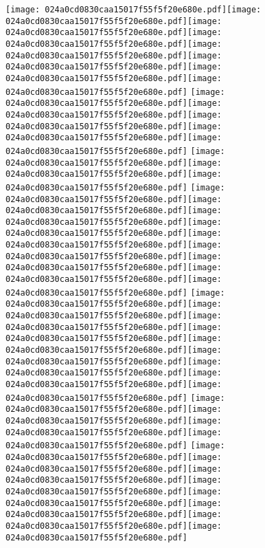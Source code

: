 \documentclass{article}
\newcommand{\origpg}[2]{\texttt{[image: 024a0cd0830caa15017f55f5f20e680e.pdf]}}
\begin{document}
{\vspace{28.908pt}\hspace{18.094pt}\origpg6{103.4pt 437.11pt 115.05pt 453.25pt}\origpg6{114.95pt 437.11pt 122.12pt 453.25pt}\origpg6{122.17pt 437.11pt 130.8pt 453.25pt}\origpg6{130.8pt 437.11pt 138.87pt 453.25pt}\origpg6{138.79pt 437.11pt 146.41pt 453.25pt}\origpg6{146.49pt 437.11pt 155.13pt 453.25pt}\origpg6{155.13pt 437.11pt 163.2pt 453.25pt}\origpg6{163.12pt 437.11pt 171.75pt 453.25pt} \origpg6{183.08pt 437.11pt 191.72pt 453.25pt}\origpg6{191.72pt 437.11pt 198.88pt 453.25pt}\hspace{-0.145pt}\origpg6{198.74pt 437.11pt 206.79pt 453.25pt}\origpg6{206.69pt 437.11pt 214.05pt 453.25pt}\origpg6{214.15pt 437.11pt 226.21pt 453.25pt} \origpg6{237.51pt 437.11pt 246.14pt 453.25pt}\origpg6{246.14pt 437.11pt 254.21pt 453.25pt}\origpg6{254.13pt 437.11pt 262.77pt 453.25pt} \origpg6{274.35pt 437.11pt 282.99pt 453.25pt}\hspace{-0.21pt}\origpg6{282.78pt 437.11pt 289.95pt 453.25pt}\hspace{-0.178pt}\origpg6{289.77pt 437.11pt 298.4pt 453.25pt}\origpg6{298.4pt 437.11pt 307.04pt 453.25pt}\hspace{-0.161pt}\origpg6{306.88pt 437.11pt 314.04pt 453.25pt}\hspace{0.291pt}\origpg6{314.33pt 437.11pt 321.5pt 453.25pt}\hspace{-0.178pt}\origpg6{321.32pt 437.11pt 329.96pt 453.25pt}\origpg6{329.96pt 437.11pt 338.59pt 453.25pt}\origpg6{338.66pt 437.11pt 347.29pt 453.25pt} \origpg6{358.62pt 437.11pt 367.26pt 453.25pt}\origpg6{367.26pt 437.11pt 375.33pt 453.25pt}\hspace{0.145pt}\origpg6{375.47pt 437.11pt 383.54pt 453.25pt}\hspace{-0.113pt}\origpg6{383.43pt 437.11pt 390.05pt 453.25pt}\hspace{-0.113pt}\origpg6{389.94pt 437.11pt 398.01pt 453.25pt}\hspace{-0.113pt}\origpg6{397.89pt 437.11pt 405.06pt 453.25pt}\origpg6{405.11pt 437.11pt 415.32pt 453.25pt}\origpg6{415.23pt 437.11pt 425.44pt 453.25pt}\origpg6{425.35pt 437.11pt 436.19pt 453.25pt} \origpg6{447.73pt 437.11pt 455.95pt 453.25pt}\hspace{-0.258pt}\origpg6{455.69pt 437.11pt 466.54pt 453.25pt}\origpg6{466.54pt 437.11pt 474.59pt 453.25pt}\hspace{-0.113pt}\origpg6{474.48pt 437.11pt 482.55pt 453.25pt} \origpg6{493.98pt 437.11pt 501.14pt 453.25pt}\origpg6{501.19pt 437.11pt 509.26pt 453.25pt}\hspace{-0.113pt}\origpg6{509.15pt 437.11pt 515.52pt 453.25pt}\hspace{-0.355pt}\origpg6{515.17pt 437.11pt 523.38pt 453.25pt}\origpg6{523.38pt 437.11pt 530.55pt 453.25pt}\origpg6{530.55pt 437.11pt 539.18pt 453.25pt}\origpg6{539.25pt 437.11pt 547.88pt 453.25pt}\origpg6{547.88pt 437.11pt 555.05pt 453.25pt} 

}
\end{document}
